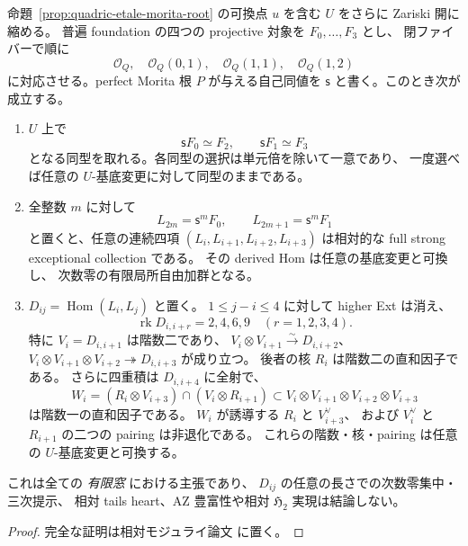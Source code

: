 \begin{proposition}
\label{prop:quadric-etale-finite-window}
命題~\ref{prop:quadric-etale-morita-root} の可換点 $u$ を含む
$U$ をさらに Zariski 開に縮める。
普遍 foundation の四つの projective 対象を $F_0,\ldots,F_3$ とし、
閉ファイバーで順に
\[
 \mathcal O_Q,\quad \mathcal O_Q(0,1),\quad
 \mathcal O_Q(1,1),\quad \mathcal O_Q(1,2)
\]
に対応させる。perfect Morita 根 $P$ が与える自己同値を
$\mathsf s$ と書く。このとき次が成立する。
\begin{enumerate}
\item $U$ 上で
  \[
     \mathsf sF_0\simeq F_2,\qquad
     \mathsf sF_1\simeq F_3
  \]
  となる同型を取れる。各同型の選択は単元倍を除いて一意であり、
  一度選べば任意の $U$-基底変更に対して同型のままである。
\item 全整数 $m$ に対して
  \[
    L_{2m}=\mathsf s^m F_0,\qquad
    L_{2m+1}=\mathsf s^m F_1
  \]
  と置くと、任意の連続四項 $(L_i,L_{i+1},L_{i+2},L_{i+3})$
  は相対的な full strong exceptional collection である。
  その derived Hom は任意の基底変更と可換し、
  次数零の有限局所自由加群となる。
\item $D_{ij}=\operatorname{Hom}(L_i,L_j)$ と置く。
  $1\leq j-i\leq4$ に対して higher Ext は消え、
  \[
    \operatorname{rk}D_{i,i+r}=2,4,6,9
       \quad(r=1,2,3,4).
  \]
  特に $V_i=D_{i,i+1}$ は階数二であり、
  $V_i\otimes V_{i+1}\xrightarrow{\sim}D_{i,i+2}$、
  $V_i\otimes V_{i+1}\otimes V_{i+2}\twoheadrightarrow
     D_{i,i+3}$ が成り立つ。
  後者の核 $R_i$ は階数二の直和因子である。
  さらに四重積は $D_{i,i+4}$ に全射で、
  \[
    W_i=(R_i\otimes V_{i+3})\cap
              (V_i\otimes R_{i+1})
       \subset V_i\otimes V_{i+1}\otimes V_{i+2}\otimes V_{i+3}
  \]
  は階数一の直和因子である。
  $W_i$ が誘導する $R_i$ と $V_{i+3}^{\vee}$、
  および $V_i^{\vee}$ と $R_{i+1}$ の二つの pairing は非退化である。
  これらの階数・核・pairing は任意の $U$-基底変更と可換する。
\end{enumerate}
これは全ての \emph{有限窓} における主張であり、
$D_{ij}$ の任意の長さでの次数零集中・三次提示、
相対 tails heart、AZ 豊富性や相対 $\mathfrak H_2$ 実現は結論しない。
\end{proposition}
\begin{proof}
完全な証明は相対モジュライ論文 \cite[\texttt{artin_roots}]{QuadricModuli2026} に置く。
\end{proof}



